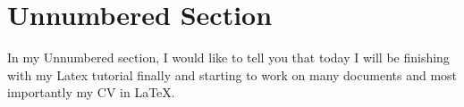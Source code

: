 \documentclass[12pt, letterpaper, twoside]{article}
\begin{document}
\section*{Unnumbered Section}
In my Unnumbered section, I would like to tell you that today I will be finishing with my Latex tutorial finally and starting to work on many documents and most importantly my CV in \LaTeX.
\end{document}
